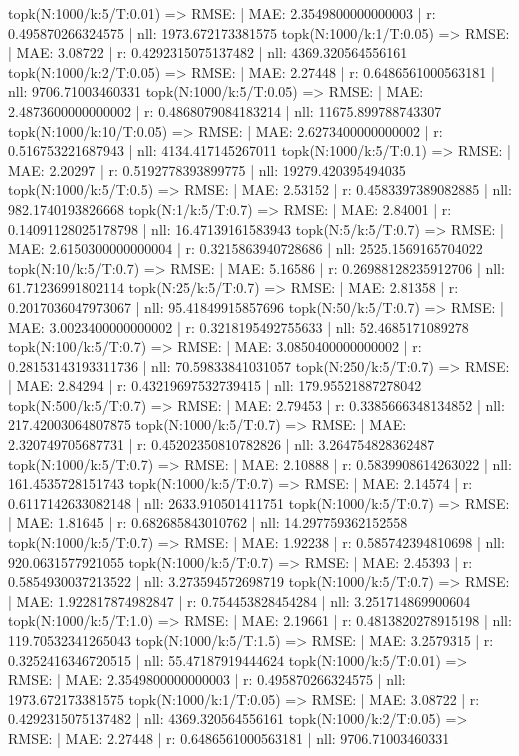topk(N:1000/k:5/T:0.01) => RMSE: | MAE: 2.3549800000000003 | r: 0.495870266324575 | nll: 1973.672173381575
topk(N:1000/k:1/T:0.05) => RMSE: | MAE: 3.08722 | r: 0.4292315075137482 | nll: 4369.320564556161
topk(N:1000/k:2/T:0.05) => RMSE: | MAE: 2.27448 | r: 0.6486561000563181 | nll: 9706.71003460331
topk(N:1000/k:5/T:0.05) => RMSE: | MAE: 2.4873600000000002 | r: 0.4868079084183214 | nll: 11675.899788743307
topk(N:1000/k:10/T:0.05) => RMSE: | MAE: 2.6273400000000002 | r: 0.516753221687943 | nll: 4134.417145267011
topk(N:1000/k:5/T:0.1) => RMSE: | MAE: 2.20297 | r: 0.5192778393899775 | nll: 19279.420395494035
topk(N:1000/k:5/T:0.5) => RMSE: | MAE: 2.53152 | r: 0.4583397389082885 | nll: 982.1740193826668
topk(N:1/k:5/T:0.7) => RMSE: | MAE: 2.84001 | r: 0.14091128025178798 | nll: 16.47139161583943
topk(N:5/k:5/T:0.7) => RMSE: | MAE: 2.6150300000000004 | r: 0.3215863940728686 | nll: 2525.1569165704022
topk(N:10/k:5/T:0.7) => RMSE: | MAE: 5.16586 | r: 0.26988128235912706 | nll: 61.71236991802114
topk(N:25/k:5/T:0.7) => RMSE: | MAE: 2.81358 | r: 0.2017036047973067 | nll: 95.41849915857696
topk(N:50/k:5/T:0.7) => RMSE: | MAE: 3.0023400000000002 | r: 0.3218195492755633 | nll: 52.4685171089278
topk(N:100/k:5/T:0.7) => RMSE: | MAE: 3.0850400000000002 | r: 0.28153143193311736 | nll: 70.59833841031057
topk(N:250/k:5/T:0.7) => RMSE: | MAE: 2.84294 | r: 0.43219697532739415 | nll: 179.95521887278042
topk(N:500/k:5/T:0.7) => RMSE: | MAE: 2.79453 | r: 0.3385666348134852 | nll: 217.42003064807875
topk(N:1000/k:5/T:0.7) => RMSE: | MAE: 2.320749705687731 | r: 0.45202350810782826 | nll: 3.264754828362487
topk(N:1000/k:5/T:0.7) => RMSE: | MAE: 2.10888 | r: 0.5839908614263022 | nll: 161.4535728151743
topk(N:1000/k:5/T:0.7) => RMSE: | MAE: 2.14574 | r: 0.6117142633082148 | nll: 2633.910501411751
topk(N:1000/k:5/T:0.7) => RMSE: | MAE: 1.81645 | r: 0.682685843010762 | nll: 14.297759362152558
topk(N:1000/k:5/T:0.7) => RMSE: | MAE: 1.92238 | r: 0.585742394810698 | nll: 920.0631577921055
topk(N:1000/k:5/T:0.7) => RMSE: | MAE: 2.45393 | r: 0.5854930037213522 | nll: 3.273594572698719
topk(N:1000/k:5/T:0.7) => RMSE: | MAE: 1.922817874982847 | r: 0.754453828454284 | nll: 3.251714869900604
topk(N:1000/k:5/T:1.0) => RMSE: | MAE: 2.19661 | r: 0.4813820278915198 | nll: 119.70532341265043
topk(N:1000/k:5/T:1.5) => RMSE: | MAE: 3.2579315 | r: 0.3252416346720515 | nll: 55.47187919444624
topk(N:1000/k:5/T:0.01) => RMSE: | MAE: 2.3549800000000003 | r: 0.495870266324575 | nll: 1973.672173381575
topk(N:1000/k:1/T:0.05) => RMSE: | MAE: 3.08722 | r: 0.4292315075137482 | nll: 4369.320564556161
topk(N:1000/k:2/T:0.05) => RMSE: | MAE: 2.27448 | r: 0.6486561000563181 | nll: 9706.71003460331
